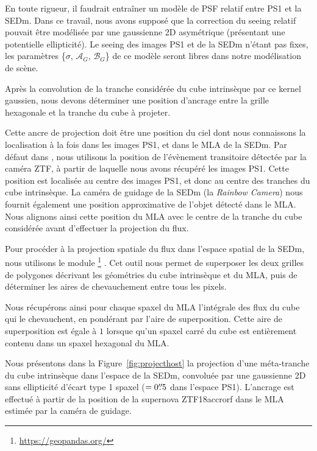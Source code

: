 \documentclass[../main/main.tex]{subfiles}
\begin{document}
En toute rigueur, il faudrait entraîner un modèle de PSF relatif entre
PS1 et la SEDm. Dans ce travail, nous avons supposé que la correction du
seeing relatif pouvait être modélisée par une gaussienne 2D asymétrique
(présentant une potentielle ellipticité). Le seeing des images PS1 et
de la SEDm n'étant pas fixes, les paramètres \{$\sigma$,
$\mathcal{A}_{G}$, $\mathcal{B}_{G}$\} de ce modèle seront libres
dans notre modélisation de scène.

Après la convolution de la tranche considérée du cube intrinsèque par ce
kernel gaussien, nous devons déterminer une position d'ancrage entre la
grille hexagonale et la tranche du cube à projeter.

Cette ancre de projection doit être une position du ciel dont nous
connaissons la localisation à la fois dans les images PS1, et dans le
MLA de la SEDm. Par défaut dans \hypergal, nous utilisons la position
de l'évènement transitoire détectée par la caméra ZTF, à partir de
laquelle nous avons récupéré les images PS1. Cette position est
localisée au centre des images PS1, et donc au centre des tranches du
cube intrinsèque. La caméra de guidage de la
SEDm (la \textit{Rainbow Camera}) nous fournit également une position
approximative de l'objet détecté dans le MLA.
Nous alignons ainsi cette position du MLA avec le centre de la tranche
du cube considérée avant d'effectuer la projection du flux.

Pour procéder à la projection spatiale du flux dans l'espace spatial de la SEDm,
nous utilisons le module
\footnote{\url{https://geopandas.org/}}
\citep{kelsey_jordahl_2020_3946761}.
Cet outil nous permet de superposer les deux grilles de polygones
décrivant les géométries du cube intrinsèque et du MLA, puis de
déterminer les aires de chevauchement entre tous les pixels. 

Nous récupérons ainsi pour chaque spaxel du MLA l'intégrale des flux
du cube qui le chevauchent, en pondérant
par l'aire de superposition. Cette aire de superposition est égale à $1$
lorsque qu'un spaxel carré du cube est entièrement contenu dans un spaxel
hexagonal du MLA.

Nous présentons dans la Figure~\ref{fig:projecthost} la projection d'une
méta-tranche du cube intrinsèque dans l'espace de la SEDm, convoluée par
une gaussienne 2D sans ellipticité d'écart type 1 spaxel ($=0\overset{\prime\prime}{.}5$
dans l'espace PS1). L'ancrage est effectué à
partir de la position de la supernova ZTF18accrorf dans le MLA estimée
par la caméra de guidage. 
\end{document}
